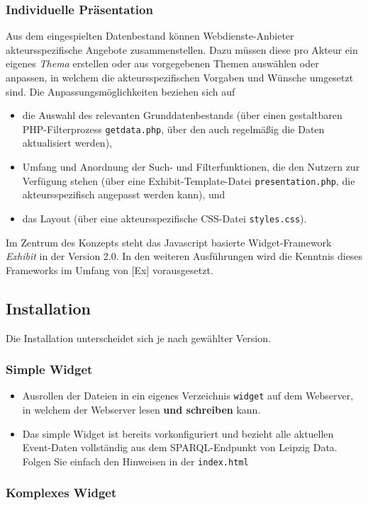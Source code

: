 \documentclass[11pt,a4paper]{article}
\begin{document}
\subsubsection{Individuelle Präsentation}
Aus dem eingespielten Datenbestand können Webdienste-Anbieter akteursspezifische Angebote
zusammenstellen.  Dazu müssen diese pro Akteur ein eigenes \emph{Thema}
erstellen oder aus vorgegebenen Themen auswählen oder anpassen, in welchem die
akteursspezifischen Vorgaben und Wünsche umgesetzt sind.  Die
Anpassungsmöglichkeiten beziehen sich auf
\begin{itemize}
\item die Auswahl des relevanten Grunddatenbestands (über einen gestaltbaren
  PHP-Filter\-prozess \texttt{getdata.php}, über den auch regelmäßig die Daten
  aktualisiert werden),
\item Umfang und Anordnung der Such- und Filterfunktionen, die den Nutzern zur
  Verfügung stehen (über eine Exhibit-Template-Datei
  \texttt{presentation.php}, die akteursspezifisch angepasst werden kann), und
\item das Layout (über eine akteursspezifische CSS-Datei \texttt{styles.css}). 
\end{itemize}
Im Zentrum des Konzepts steht das Javascript basierte Widget-Framework
\emph{Exhibit} in der Version 2.0. In den weiteren Ausführungen wird die
Kenntnis dieses Frameworks im Umfang von [Ex] vorausgesetzt.

\subsection{Installation}
Die Installation unterscheidet sich je nach gewählter Version.
\subsubsection{Simple Widget}
\begin{itemize}
\item Ausrollen der Dateien in ein eigenes Verzeichnis \texttt{widget} auf dem
  Webserver, in welchem der Webserver lesen \textbf{und schreiben} kann.
\item Das simple Widget ist bereits vorkonfiguriert und bezieht alle aktuellen Event-Daten vollständig
aus dem SPARQL-Endpunkt von Leipzig Data. Folgen Sie einfach den Hinweisen in der \texttt{index.html}
\end{itemize}
\subsubsection{Komplexes Widget}
\end{document}
